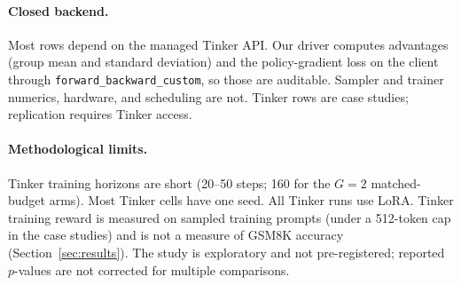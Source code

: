 \paragraph{Closed backend.}
Most rows depend on the managed Tinker API. Our driver computes advantages
(group mean and standard deviation) and the policy-gradient loss on the client
through \texttt{forward\_backward\_custom}, so those are auditable. Sampler and
trainer numerics, hardware, and scheduling are not. Tinker rows are case
studies; replication requires Tinker access.

\paragraph{Methodological limits.}
Tinker training horizons are short (20--50 steps; 160 for the $G{=}2$ matched-budget
arms). Most Tinker cells have one seed. All Tinker runs use LoRA. Tinker
training reward is measured on sampled training prompts (under a 512-token cap
in the case studies) and is not a measure of GSM8K accuracy (Section~\ref{sec:results}). The study is
exploratory and not pre-registered; reported $p$-values are not corrected for
multiple comparisons.
